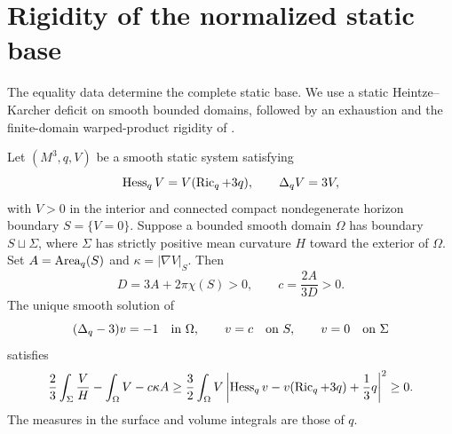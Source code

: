 \section{Rigidity of the normalized static base}
\label{hw-section}

The equality data determine the complete static base.  We use a
static Heintze--Karcher deficit on smooth bounded domains, followed
by an exhaustion and the finite-domain warped-product rigidity of
\cite[Theorem~1.1]{borghinifogagnolopinamonti2024}.

\begin{theorem}
\label{hw-public-rigidity}
Let $(M^3,q,V)$ be a smooth static system satisfying
\[
 \operatorname{Hess}_qV=V(\operatorname{Ric}_q+3q),\qquad \Delta_qV=3V,
\]
with $V>0$ in the interior and connected compact nondegenerate
horizon boundary $S=\{V=0\}$.  Suppose a bounded smooth domain
$\Omega$ has boundary $S\sqcup\Sigma$, where $\Sigma$ has strictly
positive mean curvature $H$ toward the exterior of $\Omega$.
Set $A=\operatorname{Area}_q(S)$ and $\kappa=|\nabla V|_S$.  Then
\[
 D=3A+2\pi\chi(S)>0,\qquad c=\frac{2A}{3D}>0.
\]
The unique smooth solution of
\begin{equation}\label{hw-deficit-dirichlet}
 (\Delta_q-3)v=-1\quad\hbox{in }\Omega,\qquad
 v=c\quad\hbox{on }S,\qquad v=0\quad\hbox{on }\Sigma
\end{equation}
satisfies
\begin{equation}\label{hw-static-deficit}
 \frac23\int_\Sigma\frac{V}{H}
       -\int_\Omega V-c\kappa A
 \geq\frac32\int_\Omega
       V\left|\operatorname{Hess}_qv-v(\operatorname{Ric}_q+3q)+\frac13q\right|^2\geq0.
\end{equation}
The measures in the surface and volume integrals are those of $q$.
\end{theorem}

